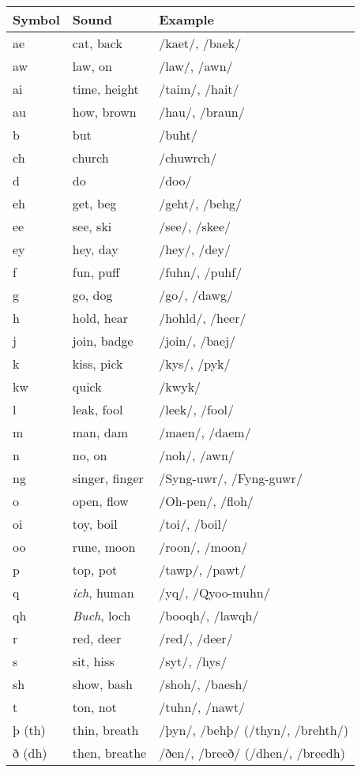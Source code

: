\documentclass[
  letterpaper,
]{book}
\begin{document}
\begin{longtable}[]{@{}lll@{}}
\toprule\noalign{}
Symbol & Sound & Example \\
\midrule\noalign{}
\endhead
\bottomrule\noalign{}
\endlastfoot
ae & cat, back & /kaet/, /baek/ \\
aw & law, on & /law/, /awn/ \\
ai & time, height & /taim/, /hait/ \\
au & how, brown & /hau/, /braun/ \\
b & but & /buht/ \\
ch & church & /chuwrch/ \\
d & do & /doo/ \\
eh & get, beg & /geht/, /behg/ \\
ee & see, ski & /see/, /skee/ \\
ey & hey, day & /hey/, /dey/ \\
f & fun, puff & /fuhn/, /puhf/ \\
g & go, dog & /go/, /dawg/ \\
h & hold, hear & /hohld/, /heer/ \\
j & join, badge & /join/, /baej/ \\
k & kiss, pick & /kys/, /pyk/ \\
kw & quick & /kwyk/ \\
l & leak, fool & /leek/, /fool/ \\
m & man, dam & /maen/, /daem/ \\
n & no, on & /noh/, /awn/ \\
ng & singer, finger & /Syng-uwr/, /Fyng-guwr/ \\
o & open, flow & /Oh-pen/, /floh/ \\
oi & toy, boil & /toi/, /boil/ \\
oo & rune, moon & /roon/, /moon/ \\
p & top, pot & /tawp/, /pawt/ \\
q & \emph{ich}, human & /yq/, /Qyoo-muhn/ \\
qh & \emph{Buch}, loch & /booqh/, /lawqh/ \\
r & red, deer & /red/, /deer/ \\
s & sit, hiss & /syt/, /hys/ \\
sh & show, bash & /shoh/, /baesh/ \\
t & ton, not & /tuhn/, /nawt/ \\
þ (th) & thin, breath & /þyn/, /behþ/ (/thyn/, /brehth/) \\
ð (dh) & then, breathe & /ðen/, /breeð/ (/dhen/, /breedh) \\

\end{longtable}
\end{document}
